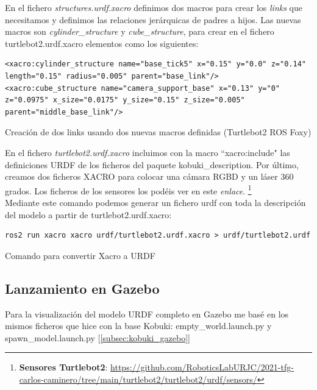 En el fichero \textit{structures.urdf.xacro} definimos dos macros para crear los \textit{links} que necesitamos y definimos las relaciones jerárquicas de padres a hijos. Las nuevas macros son \textit{cylinder\_structure} y \textit{cube\_structure}, para crear en el fichero turtlebot2.urdf.xacro elementos como los siguientes:
\begin{code}[H]
\begin{lstlisting}
<xacro:cylinder_structure name="base_tick5" x="0.15" y="0.0" z="0.14" length="0.15" radius="0.005" parent="base_link"/>
<xacro:cube_structure name="camera_support_base" x="0.13" y="0" z="0.0975" x_size="0.0175" y_size="0.15" z_size="0.005" parent="middle_base_link"/>
\end{lstlisting}
\caption{Creación de dos links usando dos nuevas macros definidas (Turtlebot2 ROS Foxy)}
\label{fig:creacion_link_macro}
\end{code}

En el fichero \textit{turtlebot2.urdf.xacro} incluimos con la macro ``xacro:include" las definiciones URDF de los ficheros del paquete kobuki\_description. Por último, creamos dos ficheros XACRO para colocar una cámara RGBD y un láser 360 grados. Los ficheros de los sensores los podéis ver en este \textit{enlace}. \footnote{\textbf{Sensores Turtlebot2}: \url{https://github.com/RoboticsLabURJC/2021-tfg-carlos-caminero/tree/main/turtlebot2/turtlebot2/urdf/sensors/}}\\

Mediante este comando podemos generar un fichero urdf con toda la descripción del modelo a partir de turtlebot2.urdf.xacro:\\
\begin{code}[H]
\begin{lstlisting}
ros2 run xacro xacro urdf/turtlebot2.urdf.xacro > urdf/turtlebot2.urdf
\end{lstlisting}
\caption{Comando para convertir Xacro a URDF}
\label{fig:comando_xacro_2_urdf}
\end{code}




\subsection{Lanzamiento en Gazebo}
\label{subsec:turtlebot2_gazebo}

Para la visualización del modelo URDF completo en Gazebo me basé en los mismos ficheros que hice con la base Kobuki: empty\_world.launch.py y spawn\_model.launch.py [\ref{subsec:kobuki_gazebo}]\\

